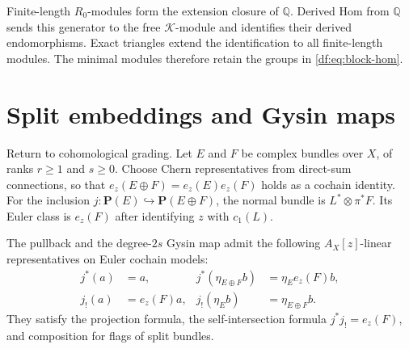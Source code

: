 Finite-length $R_0$-modules form the extension closure of $\mathbb Q$.
Derived Hom from $\mathbb Q$ sends this generator to the free
$\mathcal K$-module and identifies their derived endomorphisms.
Exact triangles extend the identification to all finite-length modules.
The minimal modules therefore retain the groups in \eqref{df:eq:block-hom}.

\section{Split embeddings and Gysin maps}
\label{df:sec:gysin}

Return to cohomological grading. Let $E$ and $F$ be complex bundles
over $X$, of ranks $r\geq1$ and $s\geq0$. Choose Chern representatives
from direct-sum connections, so that
$e_z(E\oplus F)=e_z(E)e_z(F)$ holds as a cochain identity.
For the inclusion $j:\mathbf P(E)\hookrightarrow\mathbf P(E\oplus F)$,
the normal bundle is $L^*\otimes\pi^*F$. Its Euler class is $e_z(F)$
after identifying $z$ with $c_1(L)$.

\begin{theorem}\label{df:thm:gysin}
The pullback and the degree-$2s$ Gysin map admit the following
$A_X[z]$-linear representatives on Euler cochain models:
\begin{equation}\label{df:eq:gysin}
 \begin{aligned}
 j^*(a)&=a,&
 j^*(\eta_{E\oplus F}b)&=\eta_E e_z(F)b,\\
 j_!(a)&=e_z(F)a,&
 j_!(\eta_E b)&=\eta_{E\oplus F}b.
 \end{aligned}
\end{equation}
They satisfy the projection formula, the self-intersection formula
$j^*j_!=e_z(F)$, and composition for flags of split bundles.
\end{theorem}

